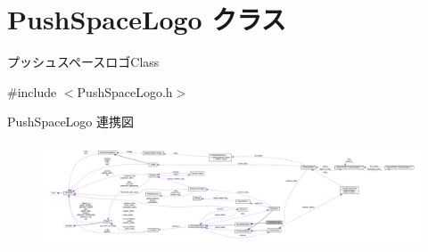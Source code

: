 \hypertarget{class_push_space_logo}{}\section{Push\+Space\+Logo クラス}
\label{class_push_space_logo}


プッシュスペースロゴ\+Class  




{\ttfamily \#include $<$Push\+Space\+Logo.\+h$>$}



Push\+Space\+Logo 連携図\nopagebreak
\begin{figure}[H]
\begin{center}
\leavevmode
\includegraphics[width=350pt]{class_push_space_logo__coll__graph}
\end{center}
\end{figure}
